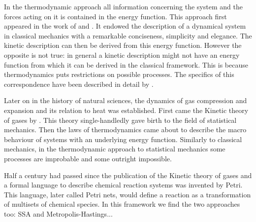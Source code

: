 In the thermodynamic approach
all information concerning the system and the forces acting on it
is contained in the energy function.
This approach first appeared in the work of
\citet{lagrange2} and \citet{hamilton}.
It endowed the description of a dynamical system in classical mechanics
with a remarkable conciseness, simplicity and elegance. %
The kinetic description can then be derived from this energy function.
However the opposite is not true:
in general a kinetic description might not have an energy function
from which it can be derived in the classical framework.
This is because thermodynamics puts restrictions on possible processes.
The specifics of this correspondence have been described
in detail by . %

Later on in the history of natural sciences,
the dynamics of gas compression and expansion
and its relation to heat was established.
First came the Kinetic theory of gases by . %
This theory single-handledly gave birth to
the field of statistical mechanics. %
Then the laws of thermodynamics came about
to describe the macro behaviour of systems
with an underlying energy function. %
Similarly to classical mechanics,
in the thermodynamic approach to statistical mechanics
some processes are improbable and some outright impossible.

Half a century had passed since the publication of
the Kinetic theory of gases and 
a formal language to describe chemical reaction systems
was invented by Petri. %
This language, later called Petri nets,
would define a reaction as a transformation of
multisets of chemical species.
In this framework we find the two approaches too:
SSA and Metropolis-Hastings...

